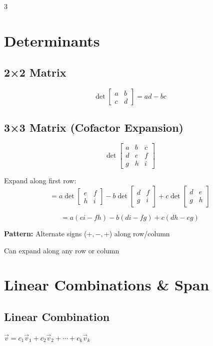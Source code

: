 \documentclass[10pt,landscape]{article}
\begin{document}
\begin{multicols*}{3}
\section*{Determinants}

\subsection*{2×2 Matrix}
$$\det\begin{bmatrix} a & b \\ c & d \end{bmatrix} = ad - bc$$

\subsection*{3×3 Matrix (Cofactor Expansion)}
$$\det\begin{bmatrix} a & b & c \\ d & e & f \\ g & h & i \end{bmatrix}$$

Expand along first row:
$$= a\det\begin{bmatrix} e & f \\ h & i \end{bmatrix} - b\det\begin{bmatrix} d & f \\ g & i \end{bmatrix} + c\det\begin{bmatrix} d & e \\ g & h \end{bmatrix}$$

$$= a(ei - fh) - b(di - fg) + c(dh - eg)$$

\textbf{Pattern:} Alternate signs ($+, -, +$) along row/column

Can expand along any row or column

\columnbreak

\section*{Linear Combinations \& Span}

\subsection*{Linear Combination}
$\vec{v} = c_1\vec{v}_1 + c_2\vec{v}_2 + \cdots + c_k\vec{v}_k$


\end{multicols*}
\end{document}
